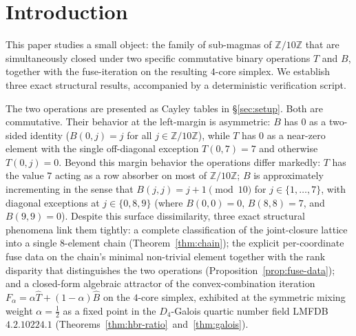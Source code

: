 \documentclass[11pt,reqno]{amsart}
\theoremstyle{plain}
\theoremstyle{definition}
\theoremstyle{remark}
\newcommand{\Z}{\mathbb{Z}}
\newcommand{\Q}{\mathbb{Q}}
\newcommand{\Zten}{\Z/10\Z}
\newcommand{\Tfuse}{\widehat{T}}
\newcommand{\Bfuse}{\widehat{B}}
\begin{document}
\begin{abstract}
A high-precision PSLQ scan over the $17$-point Stern--Brocot grid
of rationals $p/q\in(0,1)$ with $q\le 7$ confirms that
$\alpha=\tfrac12$ is the \emph{unique} rational in this grid at
which both ratios admit small-coefficient algebraic relations
(degree $\le 8$, coefficient $\le 50$);
Conjecture~\ref{conj:alpha-unique} states the corresponding
uniqueness over $\Q\cap(0,1)$ as an open question.

The chain admits a clean structural reading in terms of a
specific permutation $\pi:\Zten\to\Zten$ introduced in
\S\ref{sec:chain}: the chain walks the $\pi$-forward orbit of
$7$, with the $\pi$-fixed elements of $\{0,3,8,9\}$ contributing
at the bottom, at the size-$1\to 4$ jump, and at the size-$7\to 8$
bridge step. (We use $\pi$ rather than $\sigma$ to avoid a name
collision with the non-associativity-rate function $\sigma(N)$
of the companion paper~\cite{SandersGish2026Sigma}.)
\end{abstract}

\maketitle

\section{Introduction}\label{sec:intro}

This paper studies a small object: the family of sub-magmas of
$\Zten$ that are simultaneously closed under two specific
commutative binary operations $T$ and $B$, together with the
fuse-iteration on the resulting $4$-core simplex. We establish
three exact structural results, accompanied by a deterministic
verification script.

The two operations are presented as Cayley tables in
\S\ref{sec:setup}. Both are commutative. Their behavior at the
left-margin is asymmetric: $B$ has $0$ as a two-sided identity
($B(0, j) = j$ for all $j \in \Zten$), while $T$ has $0$ as a
near-zero element with the single off-diagonal exception
$T(0, 7) = 7$ and otherwise $T(0, j) = 0$. Beyond this margin
behavior the operations differ markedly: $T$ has the value $7$
acting as a row absorber on most of $\Zten$; $B$ is approximately
incrementing in the sense that $B(j,j) = j+1 \pmod{10}$ for
$j \in \{1,\dots,7\}$, with diagonal exceptions at
$j \in \{0,8,9\}$ (where $B(0,0)=0$, $B(8,8)=7$, and $B(9,9)=0$).
Despite this surface dissimilarity, three exact structural
phenomena link them tightly: a complete classification of the
joint-closure lattice into a single $8$-element chain
(Theorem~\ref{thm:chain}); the explicit per-coordinate fuse data
on the chain's minimal non-trivial element together with the
rank disparity that distinguishes the two operations
(Proposition~\ref{prop:fuse-data}); and a closed-form algebraic
attractor of the convex-combination iteration
$F_\alpha=\alpha\Tfuse+(1-\alpha)\Bfuse$ on the $4$-core simplex,
exhibited at the symmetric mixing weight $\alpha=\tfrac12$ as
a fixed point in the $D_4$-Galois quartic number field LMFDB~$4.2.10224.1$
(Theorems~\ref{thm:hbr-ratio}~and~\ref{thm:galois}).
\end{document}
